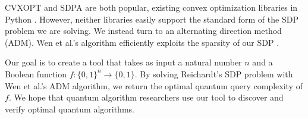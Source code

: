 CVXOPT and SDPA are both popular, existing convex optimization
libraries in Python \cite{cvxopt, SDPA}.
However, neither libraries easily support the standard form
of the SDP problem we are solving.
We instead turn to an alternating direction method (ADM).
Wen et al.'s algorithm efficiently exploits the 
sparsity of our SDP \cite{adm}.

Our goal is to create a tool that takes as input a 
natural number $n$ and a Boolean function 
$f: \{0,1\}^n \rightarrow \{0,1\}$. 
By solving Reichardt's SDP problem with
Wen et al.'s ADM algorithm,
we return the optimal quantum query complexity of
$f$. We hope that quantum algorithm researchers use
our tool to discover and verify optimal quantum
algorithms.